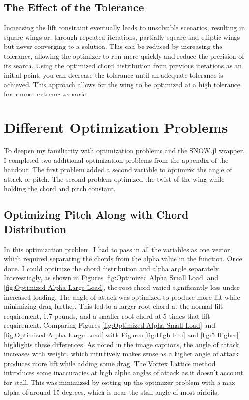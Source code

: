 \documentclass{article}
\begin{document}
\subsection{The Effect of the Tolerance}

Increasing the lift constraint eventually leads to unsolvable scenarios, resulting in square wings or, through repeated iterations, partially square and elliptic wings but never converging to a solution. This can be reduced by increasing the tolerance, allowing the optimizer to run more quickly and reduce the precision of its search. Using the optimized chord distribution from previous iterations as an initial point, you can decrease the tolerance until an adequate tolerance is achieved. This approach allows for the wing to be optimized at a high tolerance for a more extreme scenario.

\section{Different Optimization Problems}

To deepen my familiarity with optimization problems and the SNOW.jl wrapper, I completed two additional optimization problems from the appendix of the handout. The first problem added a second variable to optimize: the angle of attack or pitch. The second problem optimized the twist of the wing while holding the chord and pitch constant.

\subsection{Optimizing Pitch Along with Chord Distribution}
In this optimization problem, I had to pass in all the variables as one vector, which required separating the chords from the alpha value in the function. Once done, I could optimize the chord distribution and alpha angle separately. Interestingly, as shown in Figures \ref{fig:Optimized Alpha Small Load} and \ref{fig:Optimized Alpha Large Load}, the root chord varied significantly less under increased loading. The angle of attack was optimized to produce more lift while minimizing drag further. This led to a larger root chord at the normal lift requirement, 1.7 pounds, and a smaller root chord at 5 times that lift requirement. Comparing Figures \ref{fig:Optimized Alpha Small Load} and \ref{fig:Optimized Alpha Large Load} with Figures \ref{fig:High Res} and \ref{fig:5 Higher}  highlights these differences. As noted in the image captions, the angle of attack increases with weight, which intuitively makes sense as a higher angle of attack produces more lift while adding some drag. The Vortex Lattice method introduces some inaccuracies at high alpha angles of attack as it doesn't account for stall. This was minimized by setting up the optimizer problem with a max alpha of around 15 degrees, which is near the stall angle of most airfoils.
\end{document}
